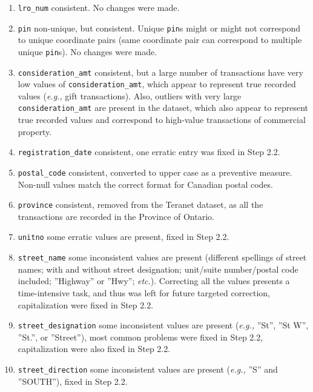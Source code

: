 \documentclass[11pt]{article}
\begin{document}
    \begin{enumerate}
        \item \texttt{lro\_num} \textemdash consistent.
        No changes were made.
        \item \texttt{pin} \textemdash non-unique, but consistent.
        Unique \texttt{pin}s might or might not correspond to unique coordinate pairs (same coordinate pair can correspond to multiple unique \texttt{pin}s).
        No changes were made.
        \item \texttt{consideration\_amt} \textemdash consistent, but a large number of transactions have very low values of \texttt{consideration\_amt}, which appear to represent true recorded values (\textit{e.g.,} gift transactions).
        Also, outliers with very large \texttt{consideration\_amt} are present in the dataset, which also appear to represent true recorded values and correspond to high-value transactions of commercial property.
        \item \texttt{registration\_date} \textemdash consistent, one erratic entry was fixed in Step 2.2.
        \item \texttt{postal\_code} \textemdash consistent, converted to upper case as a preventive measure.
        Non-null values match the correct format for Canadian postal codes.
        \item \texttt{province} \textemdash consistent, removed from the Teranet dataset, as all the transactions are recorded in the Province of Ontario.
        \item \texttt{unitno} \textemdash some erratic values are present, fixed in Step 2.2.
        \item \texttt{street\_name} \textemdash some inconsistent values are present (different spellings of street names;
        with and without street designation;
        unit/suite number/postal code included;
        ''Highway'' or ''Hwy''; \textit{etc.}).
        Correcting all the values presents a time-intensive task, and thus was left for future targeted correction, capitalization were fixed in Step 2.2.
        \item \texttt{street\_designation} \textemdash some inconsistent values are present (\textit{e.g.,} ''St'', ''St W'', ''St.'', or ''Street''), most common problems were fixed in Step 2.2, capitalization were also fixed in Step 2.2.
        \item \texttt{street\_direction} \textemdash some inconsistent values are present (\textit{e.g.,} ''S'' and ''SOUTH''), fixed in Step 2.2.

\end{enumerate}
\end{document}
